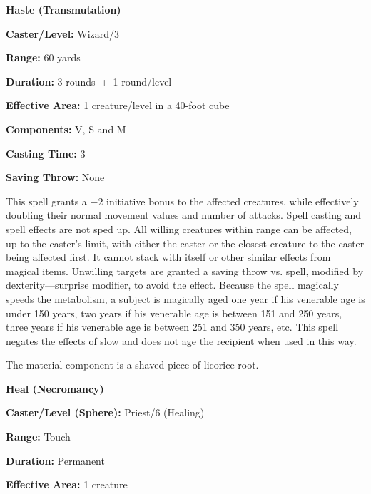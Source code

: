 \begin{multicols}{2}
\vspace{1em}

\noindent
\begin{minipage}{\columnwidth}

\noindent \textbf{Haste (Transmutation)}

\noindent \textbf{Caster/Level:} Wizard/3

\noindent \textbf{Range:} 60 yards

\noindent \textbf{Duration:} 3 rounds~+~1 round/level

\noindent \textbf{Effective Area:} 1 creature/level in a 40-foot cube

\noindent \textbf{Components:} V, S and M

\noindent \textbf{Casting Time:} 3

\noindent \textbf{Saving Throw:} None

\end{minipage}

This spell grants a $-2$ initiative bonus to the affected creatures, while effectively doubling their normal movement values and number of attacks.  Spell casting and spell effects are not sped up.  All willing creatures within range can be affected, up to the caster's limit, with either the caster or the closest creature to the caster being affected first.  It cannot stack with itself or other similar effects from magical items.  Unwilling targets are granted a saving throw vs. spell, modified by dexterity---surprise modifier, to avoid the effect.  Because the spell magically speeds the metabolism, a subject is magically aged one year if his venerable age is under 150 years, two years if his venerable age is between 151 and 250 years, three years if his venerable age is between 251 and 350 years, etc.  This spell negates the effects of slow and does not age the recipient when used in this way.  

The material component is a shaved piece of licorice root.

\vspace{1em}

\noindent
\begin{minipage}{\columnwidth}

\noindent \textbf{Heal (Necromancy)}

\noindent \textbf{Caster/Level (Sphere):} Priest/6 (Healing)

\noindent \textbf{Range:} Touch

\noindent \textbf{Duration:} Permanent

\noindent \textbf{Effective Area:} 1 creature


\end{minipage}
\end{multicols}
